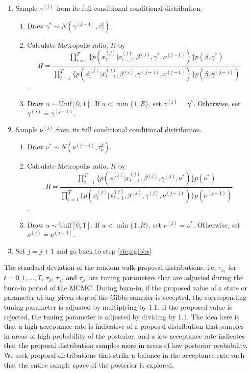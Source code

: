 \begin{enumerate}
\begin{enumerate}[label=\alph*.,leftmargin=1.75\parindent]
    \end{enumerate}
\item \label{step:gamma} Sample $\gamma^{(j)}$ from its full conditional conditional distribution.
    \begin{enumerate}[label=\alph*.,leftmargin=1.75\parindent]
    \item Draw $\gamma^* \sim N(\gamma^{(j-1)},\tau^2_{\gamma})$.
    \item Calculate Metropolis ratio, $R$ by
    \[R = \frac{\prod_{t=1}^T \{p(x^{(j)}_t|x^{(j)}_{t-1},\beta^{(j)},\gamma^*,\nu^{(j-1)})\}p(\beta, \gamma^*)}{\prod_{t=1}^T \{p(x^{(j)}_t|x^{(j)}_{t-1},\beta^{(j)},\gamma^{(j-1)},\nu^{(j-1)})\}p(\beta, \gamma^{(j-1)})}\].
    \item Draw $u \sim \mbox{Unif}[0,1]$. If $u < \min\{1, R\}$, set $\gamma^{(j)} = \gamma^*$. Otherwise, set $\gamma^{(j)} = \gamma^{(j-1)}$.
    \end{enumerate}
\item \label{step:nu} Sample $\nu^{(j)}$ from its full conditional conditional distribution.
    \begin{enumerate}[label=\alph*.,leftmargin=1.75\parindent]
    \item Draw $\nu^* \sim N(\nu^{(j-1)},\tau^2_{\nu})$.
    \item Calculate Metropolis ratio, $R$ by
    \[R = \frac{\prod_{t=1}^T \{p(x^{(j)}_t|x^{(j)}_{t-1},\beta^{(j)},\gamma^{(j)},\nu^*)\}p(\nu^*)}{\prod_{t=1}^T \{p(x^{(j)}_t|x^{(j)}_{t-1},\beta^{(j)},\gamma^{(j)},\nu^{(j-1)})\}p(\nu^{(j-1)})}\].
    \item Draw $u \sim \mbox{Unif}[0,1]$. If $u < \min\{1, R\}$, set $\nu^{(j)} = \nu^*$. Otherwise, set $\nu^{(j)} = \nu^{(j-1)}$.
    \end{enumerate}
\item Set $j = j + 1$ and go back to step \ref{step:gibbs}
\end{enumerate}
The standard deviation of the random-walk proposal distributions, i.e. $\tau_{x_t}$ for $t = 0,1,\ldots,T$, $\tau_{\beta}$, $\tau_{\gamma}$, and $\tau_{\nu}$, are tuning parameters that are adjusted during the burn-in period of the MCMC. During burn-in, if the proposed value of a state or parameter at any given step of the Gibbs sampler is accepted, the corresponding tuning parameter is adjusted by multiplying by 1.1. If the proposed value is rejected, the tuning parameter is adjusted by dividing by 1.1. The idea here is that a high acceptance rate is indicative of a proposal distribution that samples in areas of high probability of the posterior, and a low acceptance rate indicates that the proposal distribution samples more in areas of low posterior probability. We seek proposal distributions that strike a balance in the acceptance rate such that the entire sample space of the posterior is explored.

